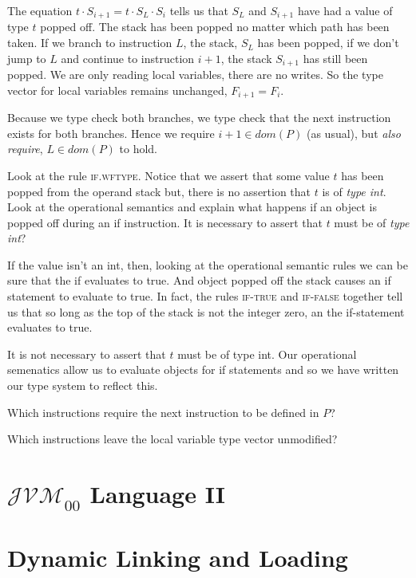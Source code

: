 The equation $t \cdot S_{i+1} = t \cdot S_L \cdot S_{i}$ 
tells us that $S_L$ and $S_{i+1}$ have had a value of type $t$ popped off. 
The stack has been popped no matter which path has been taken. 
If we branch to instruction $L$, the stack, $S_L$ has been popped, if we 
don't jump to $L$ and continue to instruction $i+1$, the stack $S_{i+1}$ has still been 
popped. We are only reading local variables, there are no writes.
So the type vector for local variables remains unchanged, $F_{i+1} = F_{i}$.

Because we type check both branches, we type check that 
the next instruction exists for both branches. Hence we require  
$i+1 \in dom(P)$ (as usual), but \textit{also require}, $L \in dom(P)$ to hold.


\frmrule

\begin{example}
Look at the rule \textsc{if.wftype}. 
Notice that we assert that some value $t$ has been popped from the operand stack but,
there is no assertion that $t$ is of \textit{type int}. Look at the operational semantics 
and explain what happens if an object is popped off during an if instruction. 
It is necessary to assert that $t$ must be of \textit{type int}?

\frmrule

If the value isn't an int, then, looking at the operational semantic rules 
we can be sure that the if evaluates to true. And object popped off the stack 
causes an if statement to evaluate to true. In fact, the rules \textsc{if-true} 
and \textsc{if-false} together tell us that so long as the top of the stack is 
not the integer zero, an the if-statement evaluates to true. 

It is not necessary to assert that $t$ must be of type int. 
Our operational semenatics allow us to evaluate objects for if statements and 
so we have written our type system to reflect this. 

\end{example}

\frmrule

\begin{example}
Which instructions require the next instruction to be defined in $P$?
\end{example}

\begin{example}
Which instructions leave the local variable type vector unmodified?
\end{example}


\section{$\mathcal{JVM}_{00}$ Language II}



\section{Dynamic Linking and Loading}